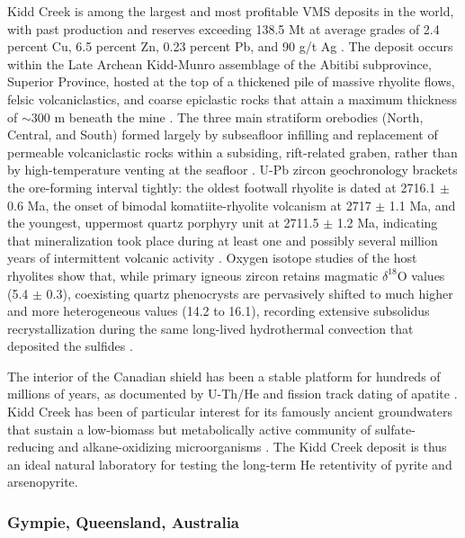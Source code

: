 Kidd Creek is among the largest and most profitable VMS deposits in the
world, with past production and reserves exceeding 138.5 Mt at average
grades of 2.4 percent Cu, 6.5 percent Zn, 0.23 percent Pb, and 90 g/t Ag
\citep{hannington1999}. The deposit occurs within the Late Archean
Kidd-Munro assemblage of the Abitibi subprovince, Superior Province, hosted
at the top of a thickened pile of massive rhyolite flows, felsic
volcaniclastics, and coarse epiclastic rocks that attain a maximum
thickness of $\sim$300 m beneath the mine \citep{hannington1999}. The three
main stratiform orebodies (North, Central, and South) formed largely by
subseafloor infilling and replacement of permeable volcaniclastic rocks
within a subsiding, rift-related graben, rather than by high-temperature
venting at the seafloor \citep{hannington1999}. U-Pb zircon geochronology
brackets the ore-forming interval tightly: the oldest footwall rhyolite is
dated at 2716.1 $\pm$ 0.6 Ma, the onset of bimodal komatiite-rhyolite
volcanism at 2717 $\pm$ 1.1 Ma, and the youngest, uppermost quartz porphyry
unit at 2711.5 $\pm$ 1.2 Ma, indicating that mineralization took place
during at least one and possibly several million years of intermittent
volcanic activity \citep{hannington1999}. Oxygen isotope studies of the
host rhyolites show that, while primary igneous zircon retains magmatic
$\delta^{18}$O values (5.4\textperthousand{} $\pm$ 0.3\textperthousand{}), coexisting quartz
phenocrysts are pervasively shifted to much higher and more heterogeneous
values (14.2\textperthousand{} to 16.1\textperthousand{}), recording extensive subsolidus
recrystallization during the same long-lived hydrothermal convection that
deposited the sulfides \citep{king1997}.

The interior of the Canadian shield has been a stable platform for hundreds of millions of years, 
as documented by U-Th/He and fission track dating of apatite \citep{sturrock2024}. 
Kidd Creek has been of particular interest for its famously ancient
groundwaters that sustain a low-biomass but metabolically active community of sulfate-reducing and
alkane-oxidizing microorganisms \citep{lollar2019}. The Kidd Creek deposit is thus an 
ideal natural laboratory for testing the long-term He retentivity of pyrite and arsenopyrite.

\subsubsection{Gympie, Queensland, Australia}\label{sec:ch3-geologic-setting-gympie}

